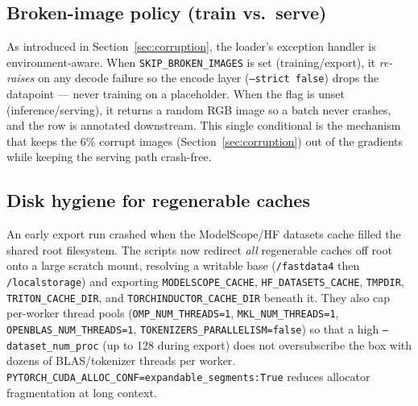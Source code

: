 \documentclass[11pt,a4paper]{article}
\begin{document}
\subsection{Broken-image policy (train vs.\ serve)}
As introduced in Section~\ref{sec:corruption}, the loader's exception handler is environment-aware. When \texttt{SKIP\_BROKEN\_IMAGES} is set (training/export), it \emph{re-raises} on any decode failure so the encode layer (\texttt{--strict false}) drops the datapoint --- never training on a placeholder. When the flag is unset (inference/serving), it returns a random RGB image so a batch never crashes, and the row is annotated downstream. This single conditional is the mechanism that keeps the 6\% corrupt images (Section~\ref{sec:corruption}) out of the gradients while keeping the serving path crash-free.

\subsection{Disk hygiene for regenerable caches}
An early export run crashed when the ModelScope/HF datasets cache filled the shared root filesystem. The scripts now redirect \emph{all} regenerable caches off root onto a large scratch mount, resolving a writable base (\texttt{/fastdata4} then \texttt{/localstorage}) and exporting \texttt{MODELSCOPE\_CACHE}, \texttt{HF\_DATASETS\_CACHE}, \texttt{TMPDIR}, \texttt{TRITON\_CACHE\_DIR}, and \texttt{TORCHINDUCTOR\_CACHE\_DIR} beneath it. They also cap per-worker thread pools (\texttt{OMP\_NUM\_THREADS=1}, \texttt{MKL\_NUM\_THREADS=1}, \texttt{OPENBLAS\_NUM\_THREADS=1}, \texttt{TOKENIZERS\_PARALLELISM=false}) so that a high \texttt{--dataset\_num\_proc} (up to 128 during export) does not oversubscribe the box with dozens of BLAS/tokenizer threads per worker. \texttt{PYTORCH\_CUDA\_ALLOC\_CONF=expandable\_segments:True} reduces allocator fragmentation at long context.
\end{document}

